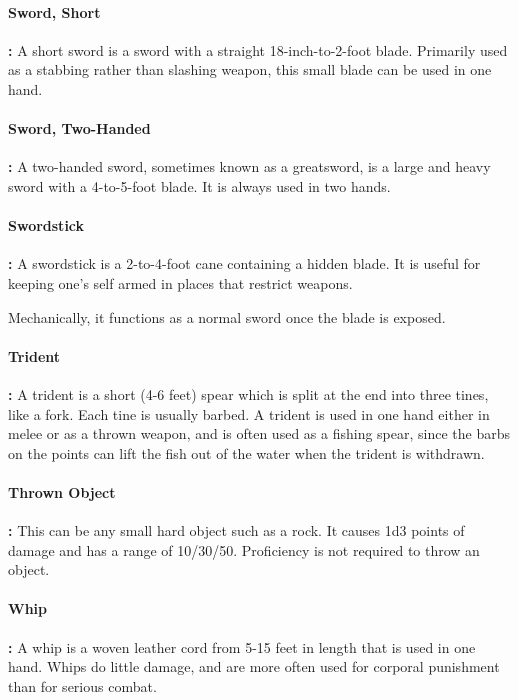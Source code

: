 \begin{multicols*}{2}
\paragraph{Sword, Short}\textbf{:} A short sword is a sword with a straight 18-inch-to-2-foot blade. Primarily used as a stabbing rather than slashing weapon, this small blade can be used in one hand.

\paragraph{Sword, Two-Handed}\textbf{:} A two-handed sword, sometimes known as a greatsword, is a large and heavy sword with a 4-to-5-foot blade. It is always used in two hands.

\paragraph{Swordstick}\textbf{:} A swordstick is a 2-to-4-foot cane containing a hidden blade. It is useful for keeping one’s self armed in places that restrict weapons.

Mechanically, it functions as a normal sword once the blade is exposed.

\paragraph{Trident}\textbf{:} A trident is a short (4-6 feet) spear which is split at the end into three tines, like a fork. Each tine is usually barbed. A trident is used in one hand either in melee or as a thrown weapon, and is often used as a fishing spear, since the barbs on the points can lift the fish out of the water when the trident is withdrawn.

\paragraph{Thrown Object}\textbf{:} This can be any small hard object such as a rock. It causes 1d3 points of damage and has a range of 10/30/50. Proficiency is not required to throw an object.

\paragraph{Whip}\textbf{:} A whip is a woven leather cord from 5-15 feet in length that is used in one hand. Whips do little damage, and are more often used for corporal punishment than for serious combat.


\end{multicols*}
